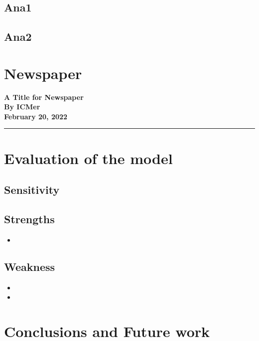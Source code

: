 \documentclass{mcmthesis}
\begin{document}
\subsection{Ana1}
\lipsum[27-28]
\subsection{Ana2}
\lipsum[29-32]
\section{Newspaper}
\begin{center}
  \textbf{\large A Title for Newspaper}\\
  \textbf{By ICMer}\\
  \textbf{\small February 20, 2022}\\
  \rule[4pt]{5cm}{0.15em}
\end{center}
\vspace{-0.5cm}
\columnseprule=1pt
\begin{multicols}{2}
  \lipsum[33-36]
\end{multicols}

\section{Evaluation of the model}
\subsection{Sensitivity}
\lipsum[37-38]
\subsection{Strengths}
\renewcommand\labelitemi{\Large$\bullet$}
\begin{itemize}[itemsep= 0 pt,topsep = 2 pt]
\item 
\end{itemize}
\subsection{Weakness}
\renewcommand\labelitemi{\Large$\bullet$}
\begin{itemize}[itemsep= 0 pt,topsep = 2 pt]
\item 
\item 
\end{itemize}

\section{Conclusions and Future work}
\end{document}

